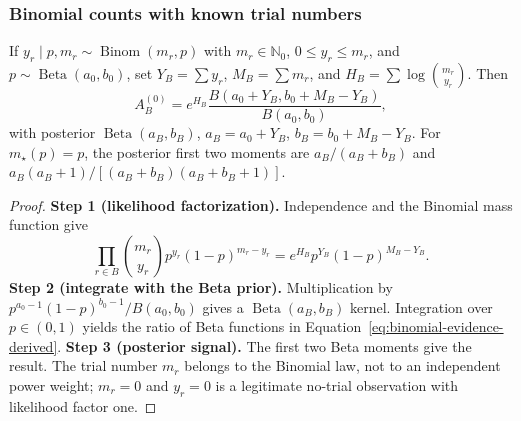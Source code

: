 \subsubsection{Binomial counts with known trial numbers}
\begin{proposition}
\label{prop:binomial-family}
If $y_r\mid p,m_r\sim\operatorname{Binom}(m_r,p)$ with $m_r\in\mathbb N_0$, $0\le y_r\le m_r$, and $p\sim\operatorname{Beta}(a_0,b_0)$, set $Y_B=\sum y_r$, $M_B=\sum m_r$, and $H_B=\sum\log\binom{m_r}{y_r}$. Then
\begin{equation}
A^{(0)}_B=e^{H_B}\frac{B(a_0+Y_B,b_0+M_B-Y_B)}{B(a_0,b_0)},
\label{eq:binomial-evidence-derived}
\end{equation}
with posterior $\operatorname{Beta}(a_B,b_B)$, $a_B=a_0+Y_B$, $b_B=b_0+M_B-Y_B$. For $m_\star(p)=p$, the posterior first two moments are $a_B/(a_B+b_B)$ and $a_B(a_B+1)/[(a_B+b_B)(a_B+b_B+1)]$.
\end{proposition}
\begin{proof}
\textbf{Step 1 (likelihood factorization).}
Independence and the Binomial mass function give
\[
\prod_{r\in B}\binom{m_r}{y_r}p^{y_r}(1-p)^{m_r-y_r}
=e^{H_B}p^{Y_B}(1-p)^{M_B-Y_B}.
\]
\textbf{Step 2 (integrate with the Beta prior).}
Multiplication by $p^{a_0-1}(1-p)^{b_0-1}/B(a_0,b_0)$ gives a $\operatorname{Beta}(a_B,b_B)$ kernel. Integration over $p\in(0,1)$ yields the ratio of Beta functions in Equation~\eqref{eq:binomial-evidence-derived}.
\textbf{Step 3 (posterior signal).}
The first two Beta moments give the result. The trial number $m_r$ belongs to the Binomial law, not to an independent power weight; $m_r=0$ and $y_r=0$ is a legitimate no-trial observation with likelihood factor one.
\end{proof}

